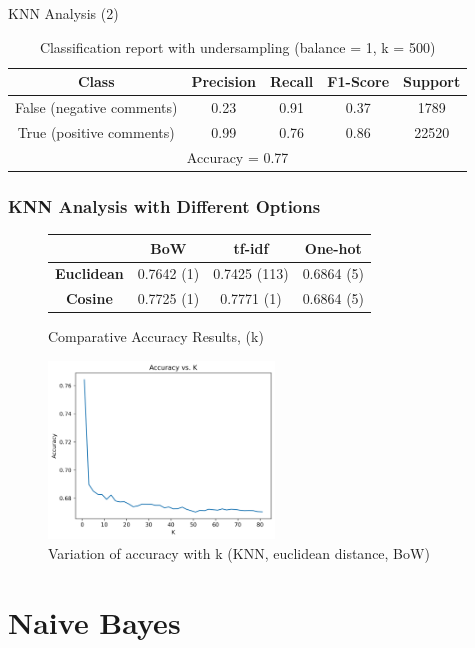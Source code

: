 \documentclass{beamer}
\begin{document}
\begin{frame}[shrink]{KNN Analysis (2)}
\begin{table}
  \centering
  \begin{tabular}{@{}ccccc@{}}
  \hline
  Class & Precision & Recall & F1-Score & Support \\
  \hline
  False (negative comments) & 0.23 & 0.91 & 0.37 & 1789 \\
  True (positive comments) & 0.99 & 0.76 & 0.86 & 22520 \\
  \hline
  \multicolumn{5}{c}{Accuracy = 0.77} \\
  \hline
  \end{tabular}
  \caption{Classification report with undersampling (balance = 1, k = 500)}
  \label{tab:KNN}
\end{table}
\end{frame}

\begin{frame}[shrink]
\frametitle{KNN Analysis with Different Options}

\begin{figure}[h]
  \centering
  \begin{tabular}{|c|c|c|c|}
  \hline
  & \textbf{BoW} & \textbf{tf-idf} & \textbf{One-hot} \\ \hline
  \textbf{Euclidean} & 0.7642 (1) & 0.7425 (113) & 0.6864 (5) \\ \hline
  \textbf{Cosine} &  0.7725 (1) & 0.7771 (1) & 0.6864 (5) \\ \hline
  \end{tabular}
  \caption{Comparative Accuracy Results, (k)}
  \label{tab:accuracy}
\end{figure}

\begin{figure}[h]
  \centering
  \includegraphics[width=6cm]{accuracy_plot.png}
  \caption{Variation of accuracy with k (KNN, euclidean distance, BoW)}
  \label{fig:KNNOptions}
\end{figure}
\end{frame}

\section{Naive Bayes}
\end{document}
